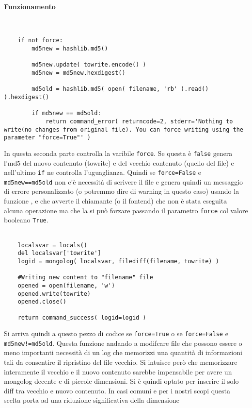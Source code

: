 \documentclass[11pt]{article}
\begin{document}
\paragraph{Funzionamento}
~\\
\begin{lstlisting}
    if not force:
        md5new = hashlib.md5()

        md5new.update( towrite.encode() )
        md5new = md5new.hexdigest()

        md5old = hashlib.md5( open( filename, 'rb' ).read() ).hexdigest()

        if md5new == md5old:
            return command_error( returncode=2, stderr='Nothing to write(no changes from original file). You can force writing using the parameter "force=True"' )
\end{lstlisting}
In questa seconda parte controlla la varibile \texttt{force}. Se questa è \texttt{false} genera l'md5 del nuovo contenuto (towrite)
e del vecchio contenuto (quello del file) e nell'ultimo \texttt{if} ne controlla l'uguaglianza. Quindi se \texttt{force=False} e
\texttt{md5new==md5old} non c'è necessità di scrivere il file e genera quindi un messaggio di errore personalizzato (o potremmo dire
di warning in questo caso) usando la funzione , e che avverte il chiamante (o il fontend) che non è stata eseguita
alcuna operazione ma che la si può forzare passando il parametro \texttt{force} col valore booleano \texttt{True}.
\\~\\
\begin{lstlisting}
    localsvar = locals()
    del localsvar['towrite']
    logid = mongolog( localsvar, filediff(filename, towrite) )

    #Writing new content to "filename" file
    opened = open(filename, 'w')
    opened.write(towrite)
    opened.close()

    return command_success( logid=logid )
\end{lstlisting}
Si arriva quindi a questo pezzo di codice se \texttt{force=True} o se \texttt{force=False} e \texttt{md5new!=md5old}.
Questa funzione andando a modifcare file che possono essere o meno importanti necessità di un log che memorizzi una quantità
di informazioni tali da consentire il ripristino del file vecchio. Si intuisce però che memorizzare interamente 
il vecchio e il nuovo contenuto sarebbe impensabile per avere un mongolog decente e di piccole dimensioni. Si è quindi optato per inserire
il solo diff tra vecchio e nuovo contenuto. In casi comuni e per i nostri scopi questa scelta porta ad una riduzione significativa della dimensione
\end{document}
